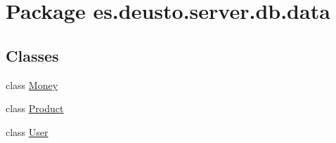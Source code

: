 \hypertarget{namespacees_1_1deusto_1_1server_1_1db_1_1data}{}\section{Package es.\+deusto.\+server.\+db.\+data}
\label{namespacees_1_1deusto_1_1server_1_1db_1_1data}
\subsection*{Classes}
\begin{DoxyCompactItemize}
\item 
class \hyperlink{classes_1_1deusto_1_1server_1_1db_1_1data_1_1_money}{Money}
\item 
class \hyperlink{classes_1_1deusto_1_1server_1_1db_1_1data_1_1_product}{Product}
\item 
class \hyperlink{classes_1_1deusto_1_1server_1_1db_1_1data_1_1_user}{User}
\end{DoxyCompactItemize}
